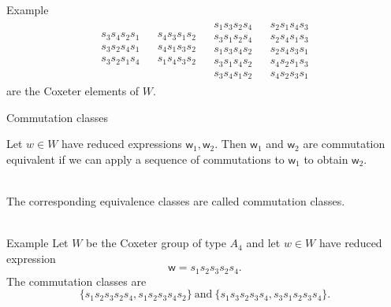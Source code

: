 \documentclass[9pt]{beamer}
\newcommand{\w}{{\textsf{w}}}
\begin{document}
\begin{frame}
\begin{block}{Example}
$${\begin{array}{cccc}
    \boxed{\begin{array}{c} \\ s_3s_4s_2s_1 \\ s_3s_2s_4s_1 \\ s_3s_2s_1s_4 \\ \\ \end{array}} & 
    \boxed{\begin{array}{c} \\ s_4s_3s_1s_2 \\ s_4s_1s_3s_2 \\ s_1s_4s_3s_2 \\ \\ \end{array}} &
    \boxed{\begin{array}{c} s_1s_3s_2s_4 \\ s_3s_1s_2s_4 \\ s_1s_3s_4s_2 \\ s_3s_1s_4s_2 \\ s_3s_4s_1s_2 \end{array}} &
    \boxed{\begin{array}{c} s_2s_1s_4s_3 \\ s_2s_4s_1s_3 \\ s_2s_4s_3s_1 \\   s_4s_2s_1s_3 \\ s_4s_2s_3s_1 \end{array}}
\end{array}}$$
    are the Coxeter elements of $W$.
\end{block}
\end{frame}

\begin{frame}{Commutation classes}
\begin{definition} Let $w \in W$ have reduced expressions $\w_1,\w_2$. Then $\w_1$ and $\w_2$ are \alert{commutation equivalent} if we can apply a sequence of commutations to $\w_1$ to obtain $\w_2$.
\end{definition} ~\\

    The corresponding equivalence classes are called \alert{commutation classes}. \\~\\ \pause

\begin{block}{Example} Let $W$ be the Coxeter group of type $A_4$ and let $w \in W$ have reduced expression $$\w = s_1 s_2 s_3 s_2 s_4.$$ %
    The commutation classes are $$\{s_1s_2s_3s_2s_4, s_1s_2s_3s_4s_2\} ~\text{and}~ \{s_1s_3s_2s_3s_4, s_3s_1s_2s_3s_4\}.$$
\end{block}
\end{frame}
\end{document}
